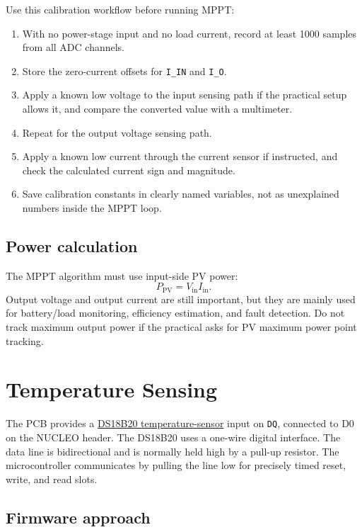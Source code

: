 \documentclass[11pt,a4paper]{article}
\newcommand{\code}[1]{\texttt{#1}}
\newcommand{\Pin}{P_{\mathrm{PV}}}
\let\originalsection\section
\renewcommand{\section}{\clearpage\originalsection}
\begin{document}
Use this calibration workflow before running MPPT:
\begin{enumerate}
  \item With no power-stage input and no load current, record at least 1000 samples from all ADC channels.
  \item Store the zero-current offsets for \code{I\_IN} and \code{I\_O}.
  \item Apply a known low voltage to the input sensing path if the practical setup allows it, and compare the converted value with a multimeter.
  \item Repeat for the output voltage sensing path.
  \item Apply a known low current through the current sensor if instructed, and check the calculated current sign and magnitude.
  \item Save calibration constants in clearly named variables, not as unexplained numbers inside the MPPT loop.
\end{enumerate}

\subsection{Power calculation}

The MPPT algorithm must use input-side PV power:
\begin{equation}
  \Pin = V_{\mathrm{in}} I_{\mathrm{in}}.
\end{equation}
Output voltage and output current are still important, but they are mainly used for battery/load monitoring, efficiency estimation, and fault detection. Do not track maximum output power if the practical asks for PV maximum power point tracking.

\section{Temperature Sensing}

The PCB provides a \href{https://www.analog.com/media/en/technical-documentation/data-sheets/ds18b20.pdf}{DS18B20 temperature-sensor} input on \code{DQ}, connected to D0 on the NUCLEO header. The DS18B20 uses a one-wire digital interface. The data line is bidirectional and is normally held high by a pull-up resistor. The microcontroller communicates by pulling the line low for precisely timed reset, write, and read slots.

\subsection{Firmware approach}
\end{document}
